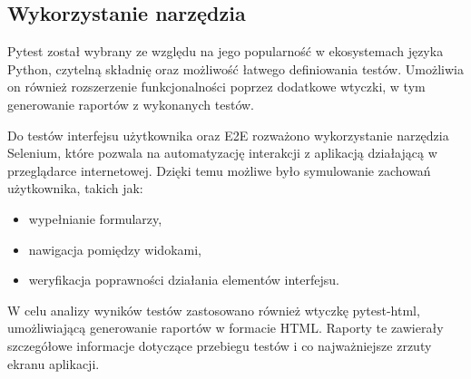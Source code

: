 \subsection{Wykorzystanie narzędzia}
\par
\gls{Pytest} został wybrany ze względu na jego popularność w ekosystemach języka Python, czytelną składnię oraz możliwość łatwego definiowania testów.
Umożliwia on również rozszerzenie funkcjonalności poprzez dodatkowe wtyczki, w tym generowanie raportów z wykonanych testów.
\par
Do testów interfejsu użytkownika oraz \gls{E2E} rozważono wykorzystanie narzędzia \gls{Selenium}, które pozwala na automatyzację interakcji z aplikacją działającą w przeglądarce internetowej.
Dzięki temu możliwe było symulowanie zachowań użytkownika, takich jak:
\begin{itemize}
    \item wypełnianie formularzy,
    \item nawigacja pomiędzy widokami,
    \item weryfikacja poprawności działania elementów interfejsu.
\end{itemize}
\par
W celu analizy wyników testów zastosowano również wtyczkę \gls{pytest-html}, umożliwiającą generowanie raportów w formacie HTML.
Raporty te zawierały szczegółowe informacje dotyczące przebiegu testów i co najważniejsze zrzuty ekranu aplikacji.
